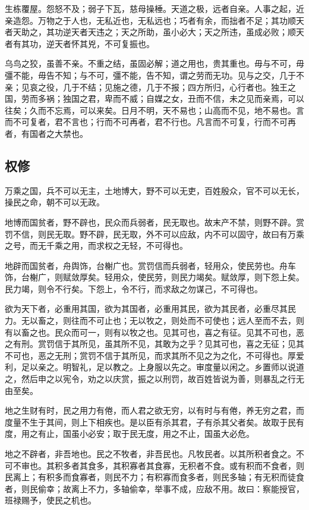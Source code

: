 \documentclass[]{article}
\begin{document}
生栋覆屋。怨怒不及；弱子下瓦，慈母操棰。天道之极，远者自亲。人事之起，近亲造怨。万物之于人也，无私近也，无私远也；巧者有余，而拙者不足；其功顺天者天助之，其功逆天者天违之；天之所助，虽小必大；天之所违，虽成必败；顺天者有其功，逆天者怀其兇，不可复振也。

乌鸟之狡，虽善不亲。不重之结，虽固必解；道之用也，贵其重也。毋与不可，毋彊不能，毋告不知；与不可，彊不能，告不知，谓之劳而无功。见与之交，几于不亲；见哀之役，几于不结；见施之德，几于不报；四方所归，心行者也。独王之国，劳而多祸；独国之君，卑而不威；自媒之女，丑而不信，未之见而亲焉，可以往矣；久而不忘焉，可以来矣。日月不明，天不易也；山高而不见，地不易也。言而不可复者，君不言也；行而不可再者，君不行也。凡言而不可复，行而不可再者，有国者之大禁也。

\hypertarget{header-n29}{%
\subsection{权修 }\label{header-n29}}

万乘之国，兵不可以无主，土地博大，野不可以无吏，百姓殷众，官不可以无长，操民之命，朝不可以无政。

地博而国贫者，野不辟也，民众而兵弱者，民无取也。故末产不禁，则野不辟。赏罚不信，则民无取。野不辟，民无取，外不可以应敌，内不可以固守，故曰有万乘之号，而无千乘之用，而求权之无轻，不可得也。

地辟而国贫者，舟舆饰，台榭广也。赏罚信而兵弱者，轻用众，使民劳也。舟车饰，台榭广，则赋敛厚矣。轻用众，使民劳，则民力竭矣。赋敛厚，则下怨上矣。民力竭，则令不行矣。下怨上，令不行，而求敌之勿谋己，不可得也。

欲为天下者，必重用其国，欲为其国者，必重用其民，欲为其民者，必重尽其民力。无以畜之，则往而不可止也；无以牧之，则处而不可使也；远人至而不去，则有以畜之也。民众而可一，则有以牧之也。见其可也，喜之有征。见其不可也，恶之有刑。赏罚信于其所见，虽其所不见，其敢为之乎？见其可也，喜之无征；见其不可也，恶之无刑；赏罚不信于其所见，而求其所不见之为之化，不可得也。厚爱利，足以亲之。明智礼，足以教之。上身服以先之。审度量以闲之。乡置师以说道之，然后申之以宪令，劝之以庆赏，振之以刑罚，故百姓皆说为善，则暴乱之行无由至矣。

地之生财有时，民之用力有倦，而人君之欲无穷，以有时与有倦，养无穷之君，而度量不生于其间，则上下相疾也。是以臣有杀其君，子有杀其父者矣。故取于民有度，用之有止，国虽小必安；取于民无度，用之不止，国虽大必危。

地之不辟者，非吾地也。民之不牧者，非吾民也。凡牧民者。以其所积者食之。不可不审也。其积多者其食多，其积寡者其食寡，无积者不食。或有积而不食者，则民离上；有积多而食寡者，则民不力；有积寡而食多者，则民多轴；有无积而徒食者，则民偷幸；故离上不力，多轴偷幸，举事不成，应敌不用。故曰：察能授官，班禄赐予，使民之机也。
\end{document}
